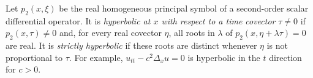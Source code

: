 
Let $p_2(x,\xi)$ be the real homogeneous principal symbol of a second-order scalar differential operator. It is \emph{hyperbolic at $x$ with respect to a time covector} $\tau\ne0$ if $p_2(x,\tau)\ne0$ and, for every real covector $\eta$, all roots in $\lambda$ of $p_2(x,\eta+\lambda\tau)=0$ are real. It is \emph{strictly hyperbolic} if these roots are distinct whenever $\eta$ is not proportional to $\tau$. For example, $u_{tt}-c^2\Delta_xu=0$ is hyperbolic in the $t$ direction for $c>0$.
